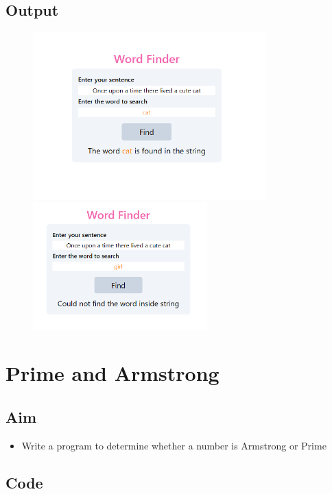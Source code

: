 \documentclass{article}
\begin{document}
\subsection{Output}
\begin{figure}[h!]
	\centering
	\includegraphics[width=0.8\textwidth]{./Assets/p0801.png}
	\includegraphics[width=0.6\textwidth]{./Assets/p0802.png}
\end{figure}
\newpage

\section{Prime and Armstrong}
\subsection{Aim}
\begin{itemize}
	\item Write a program to determine whether a number is Armstrong or Prime
\end{itemize}

\subsection{Code}
\inputminted[frame=lines, linenos, breaklines, breakanywhere, numberblanklines=false]{html}{./prog_9/index.html}
\end{document}

